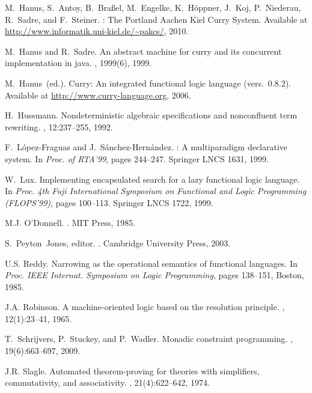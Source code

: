 \documentclass{llncs}
\begin{document}
\begin{thebibliography}{10}
M.~Hanus, S.~Antoy, B.~Bra{\ss}el, M.~Engelke, K.~H{\"o}ppner, J.~Koj,
  P.~Niederau, R.~Sadre, and F.~Steiner.
: The {P}ortland {A}achen {K}iel {C}urry {S}ystem.
\newblock Available at \url{http://www.informatik.uni-kiel.de/~pakcs/}, 2010.

M.~Hanus and R.~Sadre.
\newblock An abstract machine for curry and its concurrent implementation in
  java.
, 1999(6), 1999.

M.~Hanus~(ed.).
\newblock Curry: An integrated functional logic language (vers.\ 0.8.2).
\newblock Available at \url{http://www.curry-language.org}, 2006.

H.~Hussmann.
\newblock Nondeterministic algebraic specifications and nonconfluent term
  rewriting.
, 12:237--255, 1992.

F.~L\'opez-Fraguas and J.~S\'anchez-Hern\'andez.
: A multiparadigm declarative system.
\newblock In {\em Proc. of RTA'99}, pages 244--247. Springer LNCS 1631, 1999.

W.~Lux.
\newblock Implementing encapsulated search for a lazy functional logic
  language.
\newblock In {\em Proc. 4th Fuji International Symposium on Functional and
  Logic Programming (FLOPS'99)}, pages 100--113. Springer LNCS 1722, 1999.

M.J. O'Donnell.
.
\newblock MIT Press, 1985.

S.~Peyton~Jones, editor.
.
\newblock Cambridge University Press, 2003.

U.S. Reddy.
\newblock Narrowing as the operational semantics of functional languages.
\newblock In {\em Proc. IEEE Internat. Symposium on Logic Programming}, pages
  138--151, Boston, 1985.

J.A. Robinson.
\newblock A machine-oriented logic based on the resolution principle.
, 12(1):23--41, 1965.

T.~Schrijvers, P.~Stuckey, and P.~Wadler.
\newblock Monadic constraint programming.
, 19(6):663--697, 2009.

J.R. Slagle.
\newblock Automated theorem-proving for theories with simplifiers,
  commutativity, and associativity.
, 21(4):622--642, 1974.

\end{thebibliography}
\end{document}
